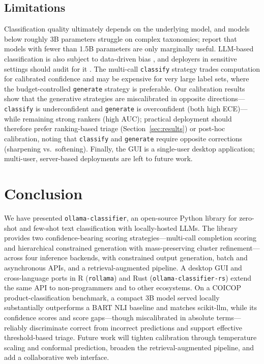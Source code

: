 \documentclass[11pt,a4paper]{article}
\begin{document}
\subsection{Limitations}

Classification quality ultimately depends on the underlying model, and models
below roughly 3B parameters struggle on complex taxonomies;
\citet{nunes2025rac} report that models with fewer than 1.5B parameters are
only marginally useful. LLM-based classification is also subject to
data-driven bias \citep{gallegos2024bias}, and deployers in sensitive settings
should audit for it \citep{yuan2026biasahead}. The multi-call \texttt{classify}
strategy trades computation for calibrated confidence and may be expensive for
very large label sets, where the budget-controlled \texttt{generate} strategy
is preferable. Our calibration results show that the generative strategies are miscalibrated
in opposite directions---\texttt{classify} is underconfident and
\texttt{generate} is overconfident (both high ECE)---while remaining strong
rankers (high AUC); practical deployment should therefore prefer ranking-based
triage (Section~\ref{sec:results}) or post-hoc calibration, noting that
\texttt{classify} and \texttt{generate} require opposite corrections
(sharpening vs.\ softening). Finally, the GUI is a single-user desktop application;
multi-user, server-based deployments are left to future work.

\section{Conclusion}
\label{sec:conclusion}

We have presented \texttt{ollama-classifier}, an open-source Python library
for zero-shot and few-shot text classification with locally-hosted LLMs. The
library provides two confidence-bearing scoring strategies---multi-call
completion scoring and hierarchical constrained generation with mass-preserving
cluster refinement---across four
inference backends, with constrained output generation, batch and asynchronous
APIs, and a retrieval-augmented pipeline. A desktop GUI and cross-language
ports in R (\texttt{rollama}) and Rust
(\texttt{ollama-classifier-rs}) extend the same API to non-programmers and to
other ecosystems. On a COICOP product-classification benchmark, a compact 3B
model served locally substantially outperforms a BART NLI baseline and matches
scikit-llm, while its confidence scores and score gaps---though miscalibrated
in absolute terms---reliably discriminate correct from incorrect predictions
and support effective threshold-based triage. Future work will tighten
calibration through temperature scaling and conformal prediction, broaden the
retrieval-augmented pipeline, and add a collaborative web interface.

\printbibliography
\end{document}
